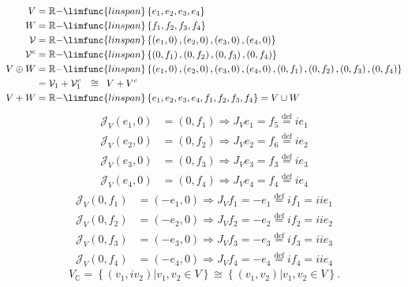 \documentclass[aps,preprint]{revtex4}
\begin{document}
\begin{align}
V & =\mathbb{R-}\limfunc{linspan}\left\{ e_{1},e_{2},e_{3},e_{4}\right\} \\
W & =\mathbb{R-}\limfunc{linspan}\left\{ f_{1},f_{2},f_{3},f_{4}\right\} \\
\mathcal{V} & =\mathbb{R-}\limfunc{linspan}\left\{ \left( e_{1},0\right)
,\left( e_{2},0\right) ,\left( e_{3},0\right) ,\left( e_{4},0\right) \right\}
\\
\mathcal{V}^{c} & =\mathbb{R-}\limfunc{linspan}\left\{ \left( 0,f_{1}\right)
,\left( 0,f_{2}\right) ,\left( 0,f_{3}\right) ,\left( 0,f_{4}\right) \right\}
\\
V\oplus W & =\mathbb{R-}\limfunc{linspan}\left\{ \left( e_{1},0\right)
,\left( e_{2},0\right) ,\left( e_{3},0\right) ,\left( e_{4},0\right) ,\left(
0,f_{1}\right) ,\left( 0,f_{2}\right) ,\left( 0,f_{3}\right) ,\left(
0,f_{4}\right) \right\} \\
& =\mathcal{V}_{1}+\mathcal{V}_{1}^{c}\,\,\mathcal{\,\,\,\,\cong\,\,\,\,}%
\,V+V^{c} \\
V+W & =\mathbb{R-}\limfunc{linspan}\left\{
e_{1},e_{2},e_{3},e_{4},f_{1},f_{2},f_{3},f_{4}\right\} =V\cup W
\end{align}%
\begin{align}
\mathcal{J}_{V}\left( e_{1},0\right) & =\left( 0,f_{1}\right) \Rightarrow
J_{V}e_{1}=f_{5}\overset{\text{def}}{=}ie_{1} \\
\mathcal{J}_{V}\left( e_{2},0\right) & =\left( 0,f_{2}\right) \Rightarrow
J_{V}e_{2}=f_{6}\overset{\text{def}}{=}ie_{2} \\
\mathcal{J}_{V}\left( e_{3},0\right) & =\left( 0,f_{3}\right) \Rightarrow
J_{V}e_{3}=f_{3}\overset{\text{def}}{=}ie_{3} \\
\mathcal{J}_{V}\left( e_{4},0\right) & =\left( 0,f_{4}\right) \Rightarrow
J_{V}e_{4}=f_{4}\overset{\text{def}}{=}ie_{4}
\end{align}%
\begin{align}
\mathcal{J}_{V}\left( 0,f_{1}\right) & =\left( -e_{1},0\right) \Rightarrow
J_{V}f_{1}=-e_{1}\overset{\text{def}}{=}if_{1}=iie_{1} \\
\mathcal{J}_{V}\left( 0,f_{2}\right) & =\left( -e_{2},0\right) \Rightarrow
J_{V}f_{2}=-e_{2}\overset{\text{def}}{=}if_{2}=iie_{2} \\
\mathcal{J}_{V}\left( 0,f_{3}\right) & =\left( -e_{3},0\right) \Rightarrow
J_{V}f_{3}=-e_{3}\overset{\text{def}}{=}if_{3}=iie_{3} \\
\mathcal{J}_{V}\left( 0,f_{4}\right) & =\left( -e_{4},0\right) \Rightarrow
J_{V}f_{4}=-e_{4}\overset{\text{def}}{=}if_{4}=iie_{4}
\end{align}%
\begin{equation}
V_{\mathbb{C}}=\left\{ \left. \left( v_{1},iv_{2}\right) \right\vert
v_{1},v_{2}\in V\right\} \cong\left\{ \left. \left( v_{1},v_{2}\right)
\right\vert v_{1},v_{2}\in V\right\} .
\end{equation}
\end{document}
